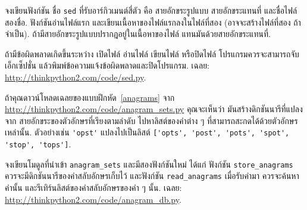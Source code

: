 \begin{exercise}

%

%
จงเขียนฟังก์ชัน ชื่อ \texttt{sed} ที่รับอาร์กิวเมนต์สี่ตัว คือ
สายอักขระรูปแบบ สายอักขระแทนที่ และชื่อไฟล์สองชื่อ.
ฟังก์ชันอ่านไฟล์แรก และเขียนเนื้อหาของไฟล์แรกลงในไฟล์ที่สอง (อาจจะสร้างไฟล์ที่สอง ถ้าจำเป็น).
ถ้ามีสายอักขระรูปแบบปรากฎอยู่ในเนื้อหาของไฟล์ แทนมันด้วยสายอักขระแทนที่.

ถ้ามีข้อผิดพลาดเกิดขึ้นระหว่าง เปิดไฟล์ อ่านไฟล์ เขียนไฟล์ หรือปิดไฟล์
โปรแกรมควรจะสามารถจับเอ็กเซ็ปชั่น แล้วพิมพ์ข้อความแจ้งข้อผิดพลาดและปิดโปรแกรม.  เฉลย: \url{http://thinkpython2.com/code/sed.py}.

\end{exercise}
\vspace{0.5cm}


\begin{exercise}


ถ้าคุณดาวน์โหลดเฉลยของแบบฝึกหัด~\ref{anagrams} จาก
\url{http://thinkpython2.com/code/anagram_sets.py}
คุณจะเห็นว่า มันสร้างดิกชันนารีที่แปลงจาก สายอักขระของตัวอักษรที่เรียงตามลำดับ
ไปหาลิสต์ของคำต่าง ๆ ที่สามารถสะกดได้ด้วยตัวอักษรเหล่านั้น.
ตัวอย่างเช่น
\verb|'opst'| แปลงไปเป็นลิสต์
\verb|['opts', 'post', 'pots', 'spot', 'stop', 'tops']|.


จงเขียนโมดูลที่นำเข้า \verb|anagram_sets| และมีสองฟังก์ชันใหม่
ได้แก่
ฟังก์ชัน \verb|store_anagrams| ควรจะมีดิกชันนารีของคำสลับอักษรเก็บไว้
และฟังก์ชัน \verb|read_anagrams| เมื่อรับคำมา ควรจะค้นหาคำนั้น 
และรีเทิร์นลิสต์ของคำสลับอักษรของคำ ๆ นั้น.
เฉลย: \url{http://thinkpython2.com/code/anagram_db.py}.

\end{exercise}
\vspace{0.5cm}


